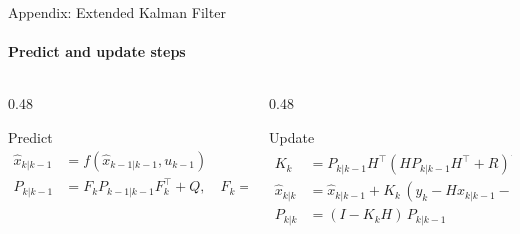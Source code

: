 \begin{frame}{Appendix: Extended Kalman Filter}
    \framesubtitle{Predict and update steps}
    \begin{columns}[T,onlytextwidth]
        \begin{column}{0.48\textwidth}
            \begin{block}{Predict}
                \footnotesize
                \vspace{-6pt}
                \begin{align*}
                    \hat{x}_{k|k-1} &= f(\hat{x}_{k-1|k-1},u_{k-1})\\
                    P_{k|k-1} &= F_k P_{k-1|k-1} F_k^\top + Q,\quad F_k=\tfrac{\partial f}{\partial x}
                \end{align*}
            \end{block}
        \end{column}
        \begin{column}{0.48\textwidth}
            \begin{block}{Update}
                \footnotesize
                \vspace{-6pt}
                \begin{align*}
                    K_k &= P_{k|k-1} H^\top (H P_{k|k-1} H^\top + R)^{-1}\\
                    \hat{x}_{k|k} &= \hat{x}_{k|k-1} + K_k\,(y_k - H\hat{x}_{k|k-1} - c)\\
                    P_{k|k} &= (I-K_kH)\,P_{k|k-1}
                \end{align*}
            \end{block}
        \end{column}
    \end{columns}
\end{frame}
